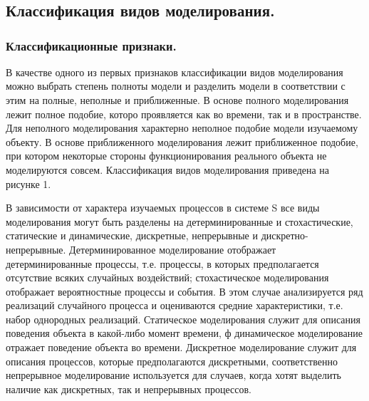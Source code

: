 
\chapter{}
\section{Классификация видов моделирования.}

\subsection{Классификационные признаки.}

 В качестве одного из первых признаков классификации видов моделирования можно выбрать степень полноты модели и разделить модели в соответствии с этим на полные, неполные и приближенные. В основе полного моделирования лежит полное подобие, которо проявляется как во времени, так и в пространстве. Для неполного моделирования характерно неполное подобие модели изучаемому объекту. В основе приближенного моделирования лежит приближенное подобие, при котором некоторые стороны функционирования реального объекта не моделируются совсем. Классификация видов моделирования приведена на рисунке 1.

    В зависимости от характера изучаемых процессов в системе S все виды моделирования могут быть разделены на детерминированные и стохастические, статические и динамические, дискретные, непрерывные и дискретно-непрерывные. Детерминированное моделирование отображает детерминированные процессы, т.е. процессы, в которых предполагается отсутствие всяких случайных воздействий; стохастическое моделирования отображает вероятностные процессы и события. В этом случае анализируется ряд реализаций случайного процесса и оцениваются средние характеристики, т.е. набор однородных реализаций. Статическое моделирования служит для описания поведения объекта в какой-либо момент времени, ф динамическое моделирование отражает поведение объекта во времени. Дискретное моделирование служит для описания процессов, которые предполагаются дискретными, соответственно непрерывное моделирование используется для случаев, когда хотят выделить наличие как дискретных, так и непрерывных процессов.

